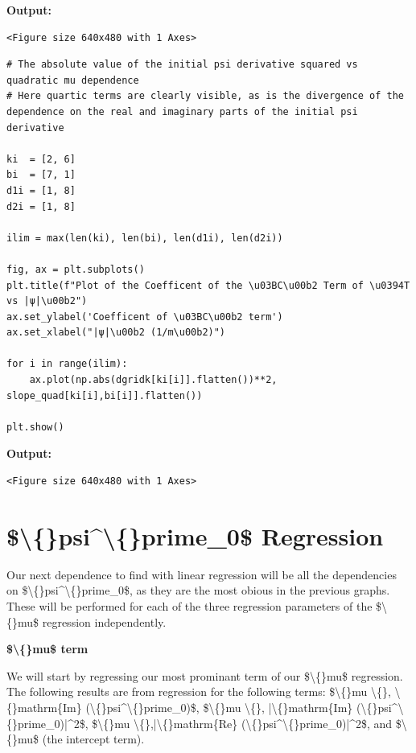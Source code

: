 \documentclass{article}
\begin{document}
\textbf{Output:}\begin{verbatim}
<Figure size 640x480 with 1 Axes>
\end{verbatim}

\begin{lstlisting}
# The absolute value of the initial psi derivative squared vs quadratic mu dependence
# Here quartic terms are clearly visible, as is the divergence of the dependence on the real and imaginary parts of the initial psi derivative

ki  = [2, 6]
bi  = [7, 1]
d1i = [1, 8]
d2i = [1, 8]

ilim = max(len(ki), len(bi), len(d1i), len(d2i))

fig, ax = plt.subplots()
plt.title(f"Plot of the Coefficent of the \u03BC\u00b2 Term of \u0394T vs |ψ|\u00b2")
ax.set_ylabel('Coefficent of \u03BC\u00b2 term')
ax.set_xlabel("|ψ|\u00b2 (1/m\u00b2)")

for i in range(ilim):
    ax.plot(np.abs(dgridk[ki[i]].flatten())**2, slope_quad[ki[i],bi[i]].flatten())

plt.show()\end{lstlisting}

\textbf{Output:}\begin{verbatim}
<Figure size 640x480 with 1 Axes>
\end{verbatim}

\section{\$\textbackslash\{\}psi\textasciicircum{}\textbackslash\{\}prime\_0\$ Regression}

Our next dependence to find with linear regression will be all the dependencies on \$\textbackslash\{\}psi\textasciicircum{}\textbackslash\{\}prime\_0\$, as they are the most obious in the previous graphs. These will be performed for each of the three regression parameters of the \$\textbackslash\{\}mu\$ regression independently.

\textbf{\$\textbackslash\{\}mu\$ term}

We will start by regressing our most prominant term of our \$\textbackslash\{\}mu\$ regression. The following results are from regression for the following terms: \$\textbackslash\{\}mu \textbackslash\{\}, \textbackslash\{\}mathrm\{Im\} (\textbackslash\{\}psi\textasciicircum{}\textbackslash\{\}prime\_0)\$, \$\textbackslash\{\}mu \textbackslash\{\}, |\textbackslash\{\}mathrm\{Im\} (\textbackslash\{\}psi\textasciicircum{}\textbackslash\{\}prime\_0)|\textasciicircum{}2\$, \$\textbackslash\{\}mu \textbackslash\{\},|\textbackslash\{\}mathrm\{Re\} (\textbackslash\{\}psi\textasciicircum{}\textbackslash\{\}prime\_0)|\textasciicircum{}2\$, and \$\textbackslash\{\}mu\$ (the intercept term).
\end{document}
